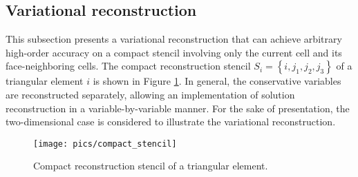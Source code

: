 \subsection{Variational reconstruction}
\label{ssec:VR}

This subsection presents a variational reconstruction \cite{wang2017compact_VR} that can achieve arbitrary high-order accuracy on a compact stencil involving only the current cell and its face-neighboring cells. The compact reconstruction stencil $S_i= \left\{i,j_1,j_2,j_3\right\}$ of a triangular element $i$ is shown in Figure \ref{fig:compactstencil}. In general, the conservative variables are reconstructed separately, allowing an implementation of solution reconstruction in a variable-by-variable manner. For the sake of presentation, the two-dimensional case is considered to illustrate the variational reconstruction.

\begin{figure}[htbp!]
    \centering
    \texttt{[image: pics/compact\_stencil]}
    \caption{Compact reconstruction stencil of a triangular element.}
    \label{fig:compactstencil}
\end{figure}

